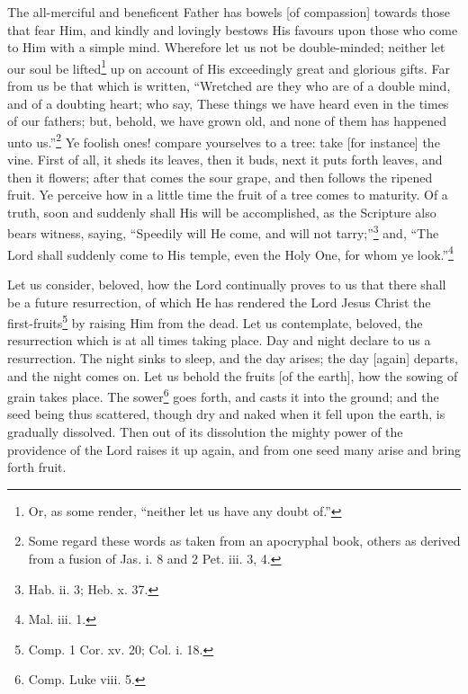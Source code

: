 
The all-merciful and beneficent Father has bowels [of compassion] towards those that fear Him, and kindly and lovingly bestows His favours upon those who come to Him with a simple mind. Wherefore let us not be double-minded; neither let our soul be lifted\footnote{Or, as some render, “neither let us have any doubt of.”} up on account of His exceedingly great and glorious gifts. Far from us be that which is written, “Wretched are they who are of a double mind, and of a doubting heart; who say, These things we have heard even in the times of our fathers; but, behold, we have grown old, and none of them has happened unto us.”\footnote{Some regard these words as taken from an apocryphal book, others as derived from a fusion of Jas. i. 8 and 2 Pet. iii. 3, 4.} Ye foolish ones! compare yourselves to a tree: take [for instance] the vine. First of all, it sheds its leaves, then it buds, next it puts forth leaves, and then it flowers; after that comes the sour grape, and then follows the ripened fruit. Ye perceive how in a little time the fruit of a tree comes to maturity. Of a truth, soon and suddenly shall His will be accomplished, as the Scripture also bears witness, saying, “Speedily will He come, and will not tarry;”\footnote{Hab. ii. 3; Heb. x. 37.} and, “The Lord shall suddenly come to His temple, even the Holy One, for whom ye look.”\footnote{Mal. iii. 1.}


Let us consider, beloved, how the Lord continually proves to us that there shall be a future resurrection, of which He has rendered the Lord Jesus Christ the first-fruits\footnote{Comp. 1 Cor. xv. 20; Col. i. 18.} by raising Him from the dead. Let us contemplate, beloved, the resurrection which is at all times taking place. Day and night declare to us a resurrection. The night sinks to sleep, and the day arises; the day [again] departs, and the night comes on.  Let us behold the fruits [of the earth], how the sowing of grain takes place. The sower\footnote{Comp. Luke viii. 5.} goes forth, and casts it into the ground; and the seed being thus scattered, though dry and naked when it fell upon the earth, is gradually dissolved. Then out of its dissolution the mighty power of the providence of the Lord raises it up again, and from one seed many arise and bring forth fruit.


